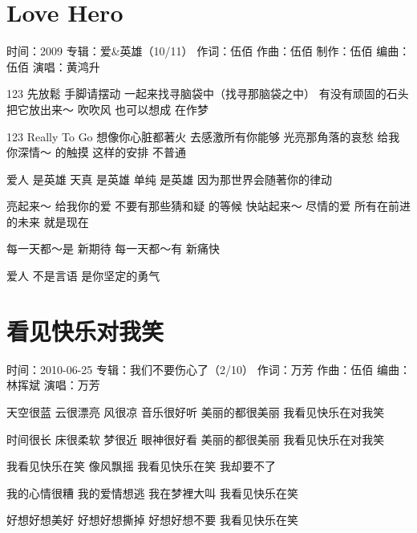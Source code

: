 \documentclass[UTF8,a4paper,oneside,twocolumn,12pt]{ctexbook}
\newcommand{\infopair}[2]{\textbullet #1：#2}
\newcommand{\zc}[1][伍佰]{\infopair{作词}{#1}}
\newcommand{\zq}[1][伍佰]{\infopair{作曲}{#1}}
\newcommand{\bq}[1][伍佰]{\infopair{编曲}{#1}}
\newcommand{\zj}[1]{\infopair{专辑}{#1}}
\newcommand{\zz}[1]{\infopair{制作}{#1}}
\newcommand{\sj}[1]{\infopair{时间}{#1}}
\newenvironment{info}{\begin{flushleft}\kaishu
	}
	{\end{flushleft}\normalsize\yahei\par}
\newenvironment{lyric}{
	}
{}
\begin{document}
\section{Love Hero}
\begin{info}
	\sj{2009}
	\zj{爱\&英雄（10/11）}
	\zc
	\zq
	\zz{伍佰}
	\bq[伍佰]
	\infopair{演唱}{黄鸿升}
\end{info}
\begin{lyric}
	123 先放鬆 手脚请摆动
	一起来找寻脑袋中（找寻那脑袋之中） 有没有顽固的石头
	把它放出来～ 吹吹风
	也可以想成 在作梦

	123 Really To Go 想像你心脏都著火
	去感激所有你能够 光亮那角落的哀愁
	给我你深情～ 的触摸
	这样的安排 不普通

	爱人 是英雄 天真 是英雄 单纯 是英雄
	因为那世界会随著你的律动

	亮起来～ 给我你的爱
	不要有那些猜和疑 的等候
	快站起来～ 尽情的爱
	所有在前进的未来 就是现在

	每一天都～是 新期待
	每一天都～有 新痛快

	爱人 不是言语 是你坚定的勇气
\end{lyric}

\section{看见快乐对我笑}
\begin{info}
	\sj{2010-06-25}
	\zj{我们不要伤心了（2/10）}
	\zc[万芳]
	\zq
	\bq[林挥斌]
	\infopair{演唱}{万芳}
\end{info}
\begin{lyric}
	天空很蓝    云很漂亮
	风很凉    音乐很好听
	美丽的都很美丽
	我看见快乐在对我笑

	时间很长    床很柔软
	梦很近    眼神很好看
	美丽的都很美丽
	我看见快乐在对我笑

	我看见快乐在笑
	像风飘摇
	我看见快乐在笑
	我却要不了

	我的心情很糟  我的爱情想逃
	我在梦裡大叫  我看见快乐在笑

	好想好想美好  好想好想撕掉
	好想好想不要  我看见快乐在笑
\end{lyric}
\end{document}
